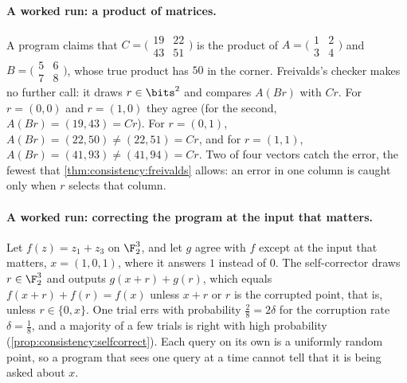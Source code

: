 \begin{refsection}
\paragraph{A worked run: a product of matrices.} A program claims that $C=\bigl(\begin{smallmatrix}19&22\\43&51\end{smallmatrix}\bigr)$ is the product of $A=\bigl(\begin{smallmatrix}1&2\\3&4\end{smallmatrix}\bigr)$ and $B=\bigl(\begin{smallmatrix}5&6\\7&8\end{smallmatrix}\bigr)$, whose true product has $50$ in the corner. Freivalds's checker makes no further call: it draws $r\in\bits^2$ and compares $A(Br)$ with $Cr$. For $r=(0,0)$ and $r=(1,0)$ they agree (for the second, $A(Br)=(19,43)=Cr$). For $r=(0,1)$, $A(Br)=(22,50)\ne(22,51)=Cr$, and for $r=(1,1)$, $A(Br)=(41,93)\ne(41,94)=Cr$. Two of four vectors catch the error, the fewest that \cref{thm:consistency:freivalds} allows: an error in one column is caught only when $r$ selects that column.

\paragraph{A worked run: correcting the program at the input that matters.} Let $f(z)=z_1+z_3$ on $\F_2^3$, and let $g$ agree with $f$ except at the input that matters, $x=(1,0,1)$, where it answers $1$ instead of $0$. The self-corrector draws $r\in\F_2^3$ and outputs $g(x+r)+g(r)$, which equals $f(x+r)+f(r)=f(x)$ unless $x+r$ or $r$ is the corrupted point, that is, unless $r\in\{0,x\}$. One trial errs with probability $\frac28=2\delta$ for the corruption rate $\delta=\frac18$, and a majority of a few trials is right with high probability (\cref{prop:consistency:selfcorrect}). Each query on its own is a uniformly random point, so a program that sees one query at a time cannot tell that it is being asked about $x$.


\end{refsection}
